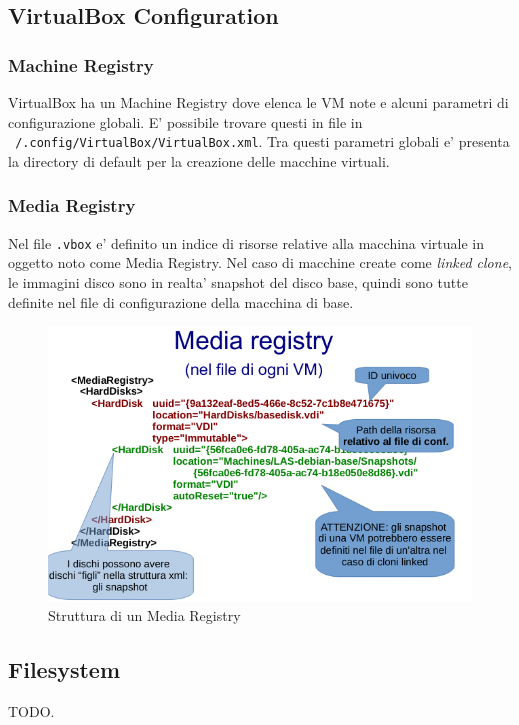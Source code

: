 \subsection{VirtualBox Configuration}
	\subsubsection{Machine Registry}
	VirtualBox ha un Machine Registry dove elenca le VM note e alcuni parametri di configurazione
	globali. E' possibile trovare questi in file in \texttt{~/.config/VirtualBox/VirtualBox.xml}.
	Tra questi parametri globali e' presenta la directory di default per la creazione delle macchine
	virtuali.

	\subsubsection{Media Registry}
	Nel file \texttt{.vbox} e' definito un indice di risorse relative alla macchina virtuale in oggetto
	noto come Media Registry. Nel caso di macchine create come \textit{linked clone}, le immagini
	disco sono in realta' snapshot del disco base, quindi sono tutte definite nel file di configurazione
	della macchina di base.
	
	\begin{figure}[H]
		\centering
		\includegraphics[scale=0.8]{img/media_registry.png}
		\caption{Struttura di un Media Registry}
	\end{figure}

\subsection{Filesystem}\label{filesystem}
TODO.



